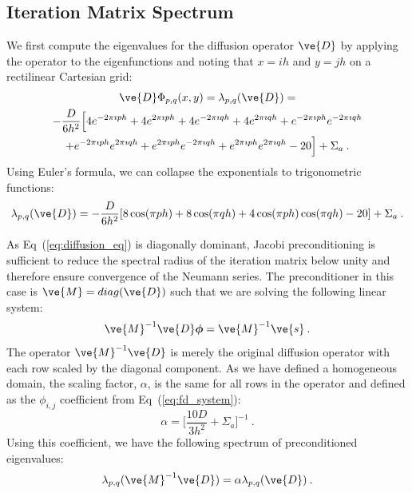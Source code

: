 \documentclass[preprint,11pt]{elsarticle}
\begin{document}
\subsection{Iteration Matrix Spectrum}
\label{subsec:iteration_spectrum}

We first compute the eigenvalues for the diffusion operator $\ve{D}$ by
applying the operator to the eigenfunctions and noting that $x=ih$ and $y=jh$
on a rectilinear Cartesian grid:
\begin{multline}
  \ve{D}\Phi_{p,q}(x,y) = \lambda_{p,q}(\ve{D})
  =\\ -\frac{D}{6h^2}\Big[4 e^{-2 \pi \imath p h} + 4 e^{2 \pi \imath
      p h} + 4 e^{-2 \pi \imath q h} + 4 e^{2 \pi \imath q h} + e^{-2
      \pi \imath p h} e^{-2 \pi \imath q h} \\ + e^{-2 \pi \imath p h}
    e^{2 \pi \imath q h} + e^{2 \pi \imath p h} e^{-2 \pi \imath q h}
    + e^{2 \pi \imath p h} e^{2 \pi \imath q h} - 20\Big] + \Sigma_a
  \:.
  \label{eq:deriv_diff_1}
\end{multline}
Using Euler's formula, we can collapse the exponentials to
trigonometric functions:
\begin{equation}
  \lambda_{p,q}(\ve{D}) = -\frac{D}{6h^2}[ 8 \cos(\pi p h) + 8
    \cos(\pi q h) + 4 \cos(\pi p h) \cos(\pi q h) - 20] + \Sigma_a\:.
  \label{eq:deriv_diff_2}
\end{equation}

As Eq~(\ref{eq:diffusion_eq}) is diagonally dominant, Jacobi preconditioning
is sufficient to reduce the spectral radius of the iteration matrix below
unity and therefore ensure convergence of the Neumann series. The
preconditioner in this case is $\ve{M} = diag(\ve{D})$ such that we are
solving the following linear system:
\begin{equation}
  \ve{M}^{-1} \ve{D} \boldsymbol{\phi} = \ve{M}^{-1} \ve{s}\:.
  \label{eq:precond_diffsion}
\end{equation}
The operator $\ve{M}^{-1} \ve{D}$ is merely the original diffusion operator
with each row scaled by the diagonal component. As we have defined a
homogeneous domain, the scaling factor, $\alpha$, is the same for all rows in
the operator and defined as the $\phi_{i,j}$ coefficient from
Eq~(\ref{eq:fd_system}):
\begin{equation}
  \alpha = \Bigg[\frac{10 D}{3 h^2} + \Sigma_a\Bigg]^{-1}\:.
  \label{eq:jacobi_scaling}
\end{equation}
Using this coefficient, we have the following spectrum of preconditioned
eigenvalues:
\begin{equation}
  \lambda_{p,q}(\ve{M}^{-1} \ve{D}) = \alpha \lambda_{p,q}(\ve{D})\:.
  \label{eq:preconditioned_eigenvalues}
\end{equation}
\end{document}
